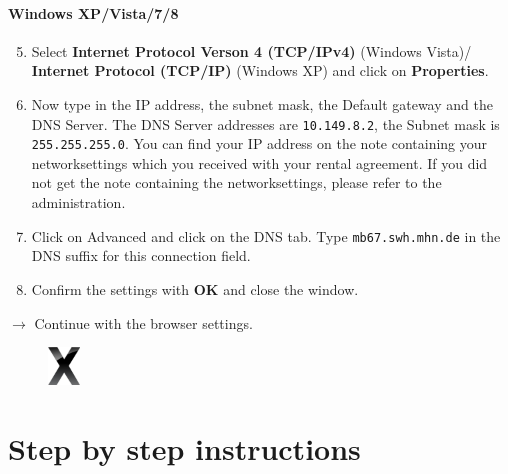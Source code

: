 \documentclass[a4paper,12pt]{scrartcl}
\newcommand{\optemph}[1]{\textbf{#1}}
\begin{document}
\paragraph*{Windows XP/Vista/7/8}
\begin{enumerate}
    \setcounter{enumi}{4}
	\item Select \optemph{Internet Protocol Verson 4 (TCP/IPv4)} (Windows Vista)/ \optemph{Internet Protocol  (TCP/IP)} (Windows XP) and click on \optemph{Properties}.
    \item Now type in the IP address, the subnet mask, the Default gateway and the DNS Server. The DNS Server addresses are \nolinkurl{10.149.8.2}, the Subnet mask is \nolinkurl{255.255.255.0}. You can find your IP address on the note containing your networksettings which you received with your rental agreement. If you did not get the note containing the networksettings, please refer to the administration.
    \item Click on Advanced and click on the DNS tab. Type \nolinkurl{mb67.swh.mhn.de} in the DNS suffix for this connection field.
	\item Confirm the settings with \optemph{OK} and close the window.
\end{enumerate}
$\rightarrow$ Continue with the browser settings.



\newpage

\begin{figure}[t!]
    \raggedleft
    \vspace{-20pt}
    \includegraphics[height=1cm,keepaspectratio]{Bilder/OSXLeopard}
    \vspace{-20pt}
\end{figure}

\section*{Step by step instructions}
\end{document}
